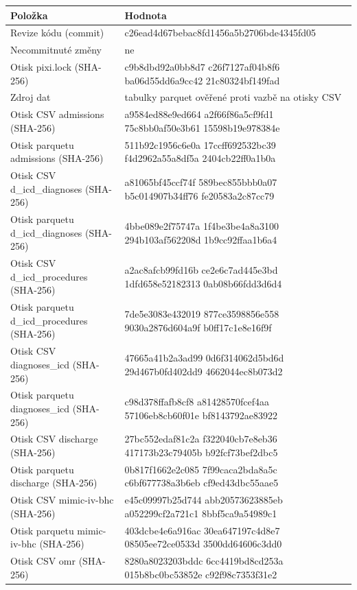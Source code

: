 \begin{tabular}{>{\raggedright\arraybackslash}p{}>{\raggedright\arraybackslash}p{}}
\toprule
Položka & Hodnota\\
\midrule
Revize kódu (commit) & c26ead4d67bebac8fd1456a5b2706bde4345fd05\\
Necommitnuté změny & ne\\
Otisk pixi.lock (SHA-256) & c9b8dbd92a0bb8d7 c26f7127af04b8f6 ba06d55dd6a9cc42 21c80324bf149fad\\
Zdroj dat & tabulky parquet ověřené proti vazbě na otisky CSV\\
Otisk CSV admissions (SHA-256) & a9584ed88e9ed664 a2f66f86a5cf9fd1 75c8bb0af50e3b61 15598b19e978384e\\
Otisk parquetu admissions (SHA-256) & 511b92c1956c6e0a 17ccff692532bc39 f4d2962a55a8df5a 2404cb22ff0a1b0a\\
Otisk CSV d\_icd\_diagnoses (SHA-256) & a81065bf45ccf74f 589bec855bbb0a07 b5c014907b34ff76 fe20583a2c87cc79\\
Otisk parquetu d\_icd\_diagnoses (SHA-256) & 4bbe089e2f75747a 1f4be3be4a8a3100 294b103af562208d 1b9cc92ffaa1b6a4\\
Otisk CSV d\_icd\_procedures (SHA-256) & a2ac8afcb99fd16b ce2e6c7ad445e3bd 1dfd658e52182313 0ab08b66fdd3d6d4\\
Otisk parquetu d\_icd\_procedures (SHA-256) & 7de5e3083e432019 877ce3598856e558 9030a2876d604a9f b0ff17c1e8e16f9f\\
Otisk CSV diagnoses\_icd (SHA-256) & 47665a41b2a3ad99 0d6f314062d5bd6d 29d467b0fd402dd9 4662044ec8b073d2\\
Otisk parquetu diagnoses\_icd (SHA-256) & c98d378ffafb8cf8 a81428570fcef4aa 57106eb8cb60f01e bf8143792ae83922\\
Otisk CSV discharge (SHA-256) & 27bc552edaf81c2a f322040cb7e8eb36 417173b23c79405b b92fcf73bef2dbc5\\
Otisk parquetu discharge (SHA-256) & 0b817f1662e2c085 7f99caca2bda8a5c c6bf677738a3b6eb cf9ed43dbc55aae5\\
Otisk CSV mimic-iv-bhc (SHA-256) & e45c09997b25d744 abb20573623885eb a052299cf2a721c1 8bbf5ca9a54989c1\\
Otisk parquetu mimic-iv-bhc (SHA-256) & 403dcbe4e6a916ac 30ea647197c4d8e7 08505ee72ce0533d 3500dd64606c3dd0\\
Otisk CSV omr (SHA-256) & 8280a8023203bddc 6cc4419bd8cd253a 015b8bc0bc53852e c92f98c7353f31e2\\

\end{tabular}
